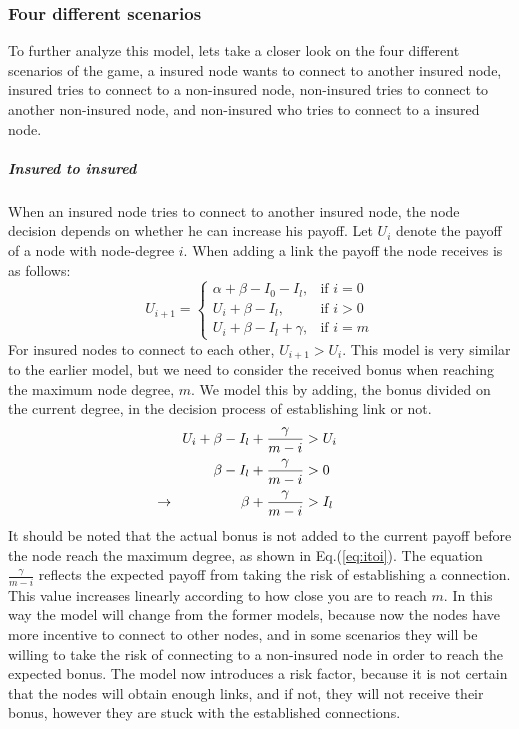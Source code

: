 \subsubsection{Four different scenarios}
To further analyze this model, lets take a closer look on the four different scenarios of the game, a insured node wants to connect to another insured node, insured tries to connect to a non-insured node, non-insured tries to connect to another non-insured node, and non-insured who tries to connect to a insured node.
\subparagraph{Insured to insured}
When an insured node tries to connect to another insured node, the node decision depends on whether he can increase his payoff. 
Let $U_{i}$ denote the payoff of a node with node-degree $i$. When adding a link the payoff the node receives is as follows:
\begin{equation}
    U_{i+1}= 
\begin{cases}
    \alpha + \beta - I_{0} - I_{l},& \text{if } i = 0\\
    U_{i}+\beta -I_{l},& \text{if }  i>0\\
    U_{i}+\beta -I_{l}+\gamma,& \text{if } i=m
    
\end{cases}
\label{eq:itoi}
\end{equation}
For insured nodes to connect to each other, $U_{i+1} > U_{i}$. This model is very similar to the earlier model, but we need to consider the received bonus when reaching the maximum node degree, $m$.
We model this by adding, the bonus divided on the current degree, in the decision process of establishing link or not. 
\begin{eqnarray}
U_{i}+\beta-I_{l}+\frac{\gamma}{m-i}&>U_{i} \nonumber \\ 
\beta-I_{l}+\frac{\gamma}{m-i}&>0 \nonumber \\ 
\llap{$\rightarrow$\hspace{50pt}} \beta+\frac{\gamma}{m-i}&>I_{l} 
\label{eq:itoi2}
\end{eqnarray}
It should be noted that the actual bonus is not added to the current payoff before the node reach the maximum degree, as shown in Eq.(\ref{eq:itoi}). The equation $\frac{\gamma}{ m-i}$ reflects the expected payoff from taking the risk of establishing a connection. This value increases linearly according to how close you are to reach $m$.
In this way the model will change from the former models, because now the nodes have more incentive to connect to other nodes, and in some scenarios they will be willing to take the risk of connecting to a non-insured node in order to reach the expected bonus. The model now introduces a risk factor, because it is not certain that the nodes will obtain enough links, and if not, they will not receive their bonus, however they are stuck with the established connections. 

